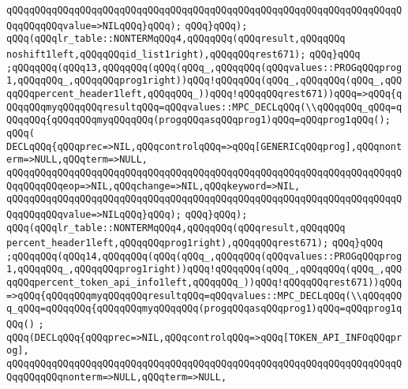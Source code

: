 \verb|qQQqqQQqqQQqqQQqqQQqqQQqqQQqqQQqqQQqqQQqqQQqqQQqqQQqqQQqqQQqqQQqqQQqqQQqqQQqqQQqvalue=>NILqQQq}qQQq);|\newline
\verb|qQQq}qQQq);|\newline
\verb|qQQq(qQQqlr_table::NONTERMqQQq4,qQQqqQQq(qQQqresult,qQQqqQQq|\newline
\verb|noshift1left,qQQqqQQqid_list1right),qQQqqQQqrest671);|\newline
\verb|qQQq}qQQq|\newline
\verb|;qQQqqQQq(qQQq13,qQQqqQQq(qQQq(qQQq_,qQQqqQQq(qQQqvalues::PROGqQQqprog1,qQQqqQQq_,qQQqqQQqprog1right))qQQq!qQQqqQQq(qQQq_,qQQqqQQq(qQQq_,qQQqqQQqpercent_header1left,qQQqqQQq_))qQQq!qQQqqQQqrest671))qQQq=>qQQq{qQQqqQQqmyqQQqqQQqresultqQQq=qQQqvalues::MPC_DECLqQQq(\\qQQqqQQq_qQQq=qQQqqQQq{qQQqqQQqmyqQQqqQQq(progqQQqasqQQqprog1)qQQq=qQQqprog1qQQq();|\newline
\verb|qQQq(|\newline
\verb|DECLqQQq{qQQqprec=>NIL,qQQqcontrolqQQq=>qQQq[GENERICqQQqprog],qQQqnonterm=>NULL,qQQqterm=>NULL,|\newline
\verb|qQQqqQQqqQQqqQQqqQQqqQQqqQQqqQQqqQQqqQQqqQQqqQQqqQQqqQQqqQQqqQQqqQQqqQQqqQQqqQQqeop=>NIL,qQQqchange=>NIL,qQQqkeyword=>NIL,|\newline
\verb|qQQqqQQqqQQqqQQqqQQqqQQqqQQqqQQqqQQqqQQqqQQqqQQqqQQqqQQqqQQqqQQqqQQqqQQqqQQqqQQqvalue=>NILqQQq}qQQq);|\newline
\verb|qQQq}qQQq);|\newline
\verb|qQQq(qQQqlr_table::NONTERMqQQq4,qQQqqQQq(qQQqresult,qQQqqQQq|\newline
\verb|percent_header1left,qQQqqQQqprog1right),qQQqqQQqrest671);|\newline
\verb|qQQq}qQQq|\newline
\verb|;qQQqqQQq(qQQq14,qQQqqQQq(qQQq(qQQq_,qQQqqQQq(qQQqvalues::PROGqQQqprog1,qQQqqQQq_,qQQqqQQqprog1right))qQQq!qQQqqQQq(qQQq_,qQQqqQQq(qQQq_,qQQqqQQqpercent_token_api_info1left,qQQqqQQq_))qQQq!qQQqqQQqrest671))qQQq=>qQQq{qQQqqQQqmyqQQqqQQqresultqQQq=qQQqvalues::MPC_DECLqQQq(\\qQQqqQQq_qQQq=qQQqqQQq{qQQqqQQqmyqQQqqQQq(progqQQqasqQQqprog1)qQQq=qQQqprog1qQQq()|\newline
\verb|;|\newline
\verb|qQQq(DECLqQQq{qQQqprec=>NIL,qQQqcontrolqQQq=>qQQq[TOKEN_API_INFOqQQqprog],|\newline
\verb|qQQqqQQqqQQqqQQqqQQqqQQqqQQqqQQqqQQqqQQqqQQqqQQqqQQqqQQqqQQqqQQqqQQqqQQqqQQqqQQqnonterm=>NULL,qQQqterm=>NULL,|\newline
